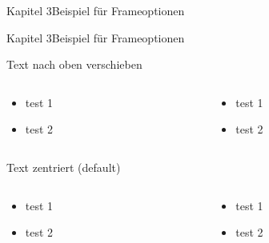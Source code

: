\begin{frame}[allowframebreaks]{Kapitel 3}{Beispiel für Frameoptionen}
  \lipsum[1]
  \lipsum[2]
\end{frame}

\begin{frame}[shrink]{Kapitel 3}{Beispiel für Frameoptionen}
  \vspace{0.5cm}
  \lipsum[1-2]
  \vspace{0.5cm}
\end{frame}

\begin{frame}[t]{Text nach oben verschieben}
  \begin{columns}
    \begin{column}[t]{0.5\textwidth}
      \begin{itemize}
        \item test 1
        \item test 2
      \end{itemize}
    \end{column}
    \begin{column}[t]{0.5\textwidth}
      \begin{itemize}
        \item test 1
        \item test 2
      \end{itemize}
    \end{column}
  \end{columns}
\end{frame}

\begin{frame}{Text zentriert (default)}
  \begin{columns}
    \begin{column}{0.5\textwidth}
      \begin{itemize}
        \item test 1
        \item test 2
      \end{itemize}
    \end{column}
    \begin{column}{0.5\textwidth}
      \begin{itemize}
        \item test 1
        \item test 2
      \end{itemize}
    \end{column}
  \end{columns}
\end{frame}
